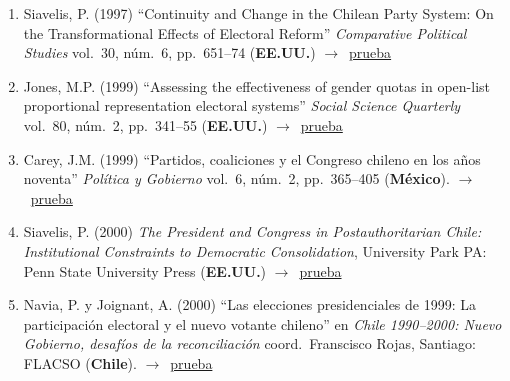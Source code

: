 \documentclass[12 pt, letter]{article}
\newenvironment{CitasMiTrabajo}{
    \begin{footnotesize}
    \begin{enumerate}[label={\footnotesize\emph{cita~\arabic*}},ref=\arabic*] %
        \setlength{\itemsep}{.1\itemsep}
        \setlength{\parskip}{.1\parskip}
    }{\end{enumerate}\end{footnotesize}}
\begin{document}
\begin{CitasMiTrabajo}
        \end{CitasMiTrabajo}


        \begin{CitasMiTrabajo}

        \item Siavelis, P. (1997)
        ``Continuity and Change in the Chilean Party System: On the Transformational Effects of Electoral
        Reform''
        \emph{Comparative Political Studies} vol.\ 30, n\'um.\ 6, pp.\ 651--74
        (\textbf{EE.UU.}) $\rightarrow$~\href{http://ericmagar.com/cv/cites/mrs/siavelis97.pdf}{prueba}

        \item Jones, M.P. (1999) ``Assessing the effectiveness of
        gender quotas in open-list proportional representation electoral
        systems'' \emph{Social Science Quarterly} vol.\ 80, n\'um.\ 2, pp.\ 341--55
        (\textbf{EE.UU.}) $\rightarrow$~\href{http://ericmagar.com/cv/cites/mrs/jonesSSQ99.pdf}{prueba}

        \item Carey, J.M. (1999)
        ``Partidos, coaliciones y el Congreso chileno en los a\~nos noventa''
        \emph{Pol\'itica y Gobierno}
        vol.\ 6, n\'um.\ 2, pp.\ 365--405   (\textbf{M\'exico}). $\rightarrow$~\href{http://ericmagar.com/cv/cites/mrs/careyPartCongChile1999pyg.excerpt.pdf}{prueba}

        \item Siavelis, P. (2000) \emph{The President and Congress in
        Postauthoritarian Chile: Institutional Constraints to Democratic
        Consolidation}, University Park PA: Penn State University Press
        (\textbf{EE.UU.}) $\rightarrow$~\href{http://ericmagar.com/cv/cites/mrs/siavelisPdtCongPostAutChi.pdf}{prueba}

        \item Navia, P. y Joignant, A. (2000)
        ``Las elecciones presidenciales de 1999:
        La participaci\'on electoral y el nuevo votante chileno'' en \emph{Chile 1990--2000:
        Nuevo Gobierno, desaf\'ios de la reconciliaci\'on} coord.\ Franscisco Rojas,
        Santiago: FLACSO (\textbf{Chile}). $\rightarrow$~\href{http://ericmagar.com/cv/cites/mrs/naviaJoignantFlacso.pdf}{prueba}


\end{CitasMiTrabajo}
\end{document}
